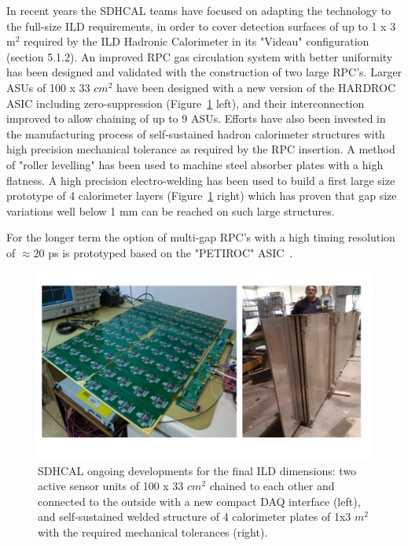 In recent years the SDHCAL teams have focused on adapting the technology to the full-size ILD requirements, in order to cover detection surfaces of up to 1 x 3 m$^2$ required by the ILD Hadronic Calorimeter in its "Videau" configuration (section 5.1.2). An improved RPC gas circulation system with better uniformity has been designed and validated with the construction of two large RPC's. Larger ASUs of 100 x 33 $cm^2$ have been designed with a new version of the HARDROC ASIC including zero-suppression (Figure~\ref{fig:det:SDHCAL_dev} left), and their interconnection improved to allow chaining of up to 9 ASUs. Efforts have also been invested in the manufacturing process of self-sustained hadron calorimeter structures with high precision mechanical tolerance as required by the RPC insertion. A method of "roller levelling" has been used to machine steel absorber plates with a high flatness. A high precision electro-welding has been used to build a first large size prototype of 4 calorimeter layers (Figure~\ref{fig:det:SDHCAL_dev} right) which has proven that gap size variations well below 1 mm can be reached on such large structures. 

For the longer term the option of multi-gap RPC's with a high timing resolution of $\approx$20 ps is prototyped based on the "PETIROC" ASIC~\cite{Fleury:2014hfa}. 

\begin{figure}[t!]
\centering
\includegraphics[width=1.0\hsize]{Detector/fig/SDHCAL_dev.jpg}
\caption{SDHCAL ongoing developments for the final ILD dimensions: two active sensor units of 100 x 33 $cm^2$ chained to each other and connected to the outside with a new compact DAQ interface (left), and self-sustained welded structure of 4 calorimeter plates of 1x3 $m^2$   with the required mechanical tolerances (right).}
\label{fig:det:SDHCAL_dev}
\end{figure}
